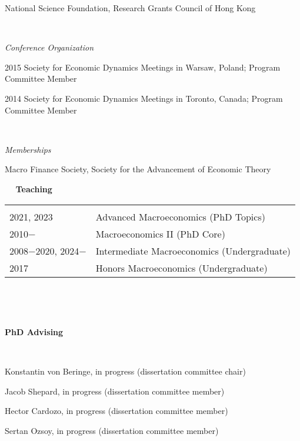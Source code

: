\documentclass[11pt]{article}
\begin{document}
National Science Foundation, Research Grants Council of Hong Kong

\ \ 

\emph{Conference Organization}

\vspace{0.3cm}


2015 Society for Economic Dynamics Meetings in Warsaw, Poland; Program Committee Member



2014 Society for Economic Dynamics Meetings in Toronto, Canada; Program Committee Member




\ \ 

\emph{Memberships} \quad

\vspace{0.3cm}

Macro Finance Society, 
Society for the Advancement of Economic Theory

\ \
\newpage
\textbf{Teaching}

\begin{tabular}{l l}
	
		
 \hspace{.1in} & \\
 
 
2021, 2023 \hspace{.3in} & Advanced Macroeconomics (PhD Topics)\\
2010$-$  \hspace{.1in} & Macroeconomics II (PhD Core) \\
2008$-$2020, 2024$-$ \hspace{.1in} & Intermediate Macroeconomics (Undergraduate) \\
2017 \hspace{.3in} & Honors Macroeconomics (Undergraduate) 

\end{tabular}

\ \ 

 \ \ 

\textbf{PhD Advising}


\ \

Konstantin von Beringe, in progress (dissertation committee chair)
 

Jacob Shepard, in progress (dissertation committee member)
 

Hector Cardozo, in progress (dissertation committee member)
 

Sertan Ozsoy, in progress (dissertation committee member)
\end{document}
